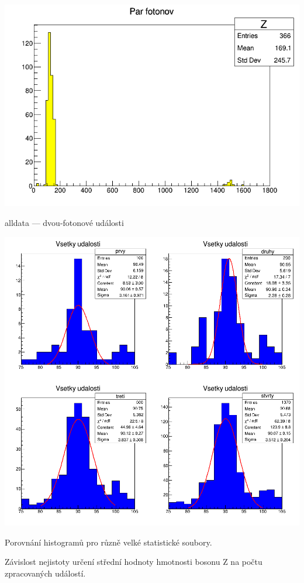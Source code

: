 \begin{graph}[htbp]
\centering
\includegraphics[width=\textwidth-2cm]{graficos/alldataz/c1_n7.png}
\caption{alldata --- dvou-fotonové události}
\label{o:a4}
\end{graph}


\begin{graph}[htbp]
\centering
\includegraphics[width=\textwidth]{graficos/comparez/platno.png}
\caption{Porovnání histogramů pro různě velké statistické soubory.}
\label{o:com}
\end{graph}


\begin{graph}[htbp]
\centering

\caption{Závislost nejistoty určení střední hodnoty hmotnosti bosonu Z na počtu zpracovaných událostí.}
\label{o:chyby}
\end{graph}